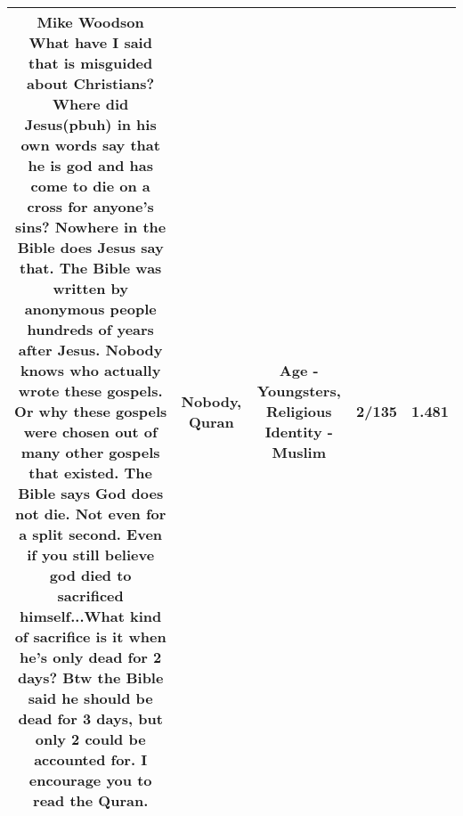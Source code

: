 \documentclass[11pt]{article}
\newlength\mylength
\begin{document}
\begin{center}
\begin{longtable}{|C{.65\mylength}|C{.30\mylength}|C{.12\mylength}|C{.12\mylength}|C{.12\mylength}|}
  \small Mike Woodson   What have I said that is misguided about Christians? Where did Jesus(pbuh) in his own words say that he is god and has come to die on a cross for anyone's sins? Nowhere in the Bible does Jesus say that. The Bible was written by anonymous people hundreds of years after Jesus. \textbf{Nobody} knows who actually wrote these gospels. Or why these gospels were chosen out of many other gospels that existed. The Bible says God does not die. Not even for a split second. Even if you still believe god died to sacrificed himself...What kind of sacrifice is it when he's only dead for 2 days? Btw the Bible said he should be dead for 3 days, but only 2 could be accounted for. I encourage you to read the \textbf{Quran}.\normalsize   & Nobody, Quran & Age - Youngsters, Religious Identity - Muslim & 2/135 & 1.481 \\  \hline

\end{longtable}
\end{center}
\end{document}
